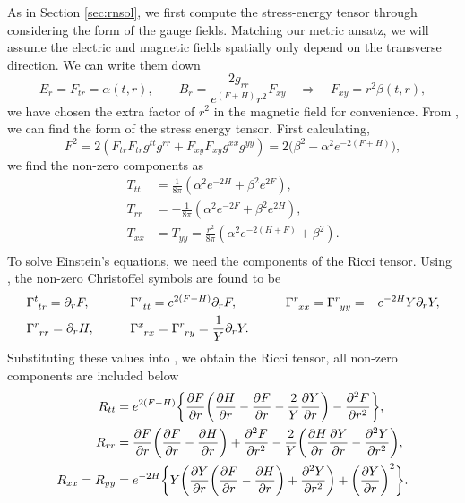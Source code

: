 As in Section \ref{sec:rnsol}, we first compute the stress-energy tensor through considering the form of the gauge fields. Matching our metric ansatz, we will assume the electric and magnetic fields spatially only depend on the transverse direction. We can write them down
\begin{equation*}
   E_r = F_{tr} = \alpha(t,r), \qquad  B_r = \frac{2g_{rr}}{e^{(F+H)}r^2} F_{xy} \quad \Rightarrow \quad F_{xy} = r^2 \beta(t,r),
\end{equation*}
we have chosen the extra factor of $r^2$ in the magnetic field for convenience. From , we can find the form of the stress energy tensor. First calculating,
\begin{equation*}
   F^2 = 2(F_{tr}F_{tr} g^{tt} g^{rr} + F_{xy}F_{xy} g^{xx} g^{yy}) = 2\big(\beta^2 - \alpha^2 e^{-2(F+H)}\big),
\end{equation*}
we find the non-zero components as
\begin{equation*}
   \begin{aligned}
     T_{tt} &= \frac{1}{8\pi} \left( \alpha^2 e^{-2H} + \beta^2 e^{2F} \right), \\
    T_{rr} &=  -\frac{1}{8\pi} \left( \alpha^2 e^{-2F} + \beta^2 e^{2H} \right), \\
    T_{xx} &= T_{yy} = \frac{r^2}{8\pi} \left( \alpha^2 e^{-2(H+F)} + \beta^2\right) .\\
   \end{aligned}
\end{equation*}
To solve Einstein's equations, we need the components of the Ricci tensor. Using , the non-zero Christoffel symbols are found to be
\begin{equation*}
\begin{aligned}
&\tensor{\Gamma}{^{t}_{tr}} = \partial_r F, \qquad  &&\tensor{\Gamma}{^{r}_{tt}} = e^{2(F-H)}\partial_r F ,\qquad  &&&&\tensor{\Gamma}{^{r}_{xx}}  = \tensor{\Gamma}{^{r}_{yy}} = -e^{-2H} Y \partial_r Y, \\
&\tensor{\Gamma}{^{r}_{rr}} = \partial_r H, \qquad   &&\tensor{\Gamma}{^{x}_{rx}}  = \tensor{\Gamma}{^{r}_{ry}} = \frac{1}{Y} \partial_r Y.
\end{aligned}
\end{equation*}
Substituting these values into , we obtain the Ricci tensor, all non-zero components are included below
\begin{equation}
\label{eq:riccicomponentspem}
  \begin{aligned}
    R_{tt} &= e^{2(F-H)} \bigg\{ \frac{\partial F}{\partial r} \bigg( \frac{\partial H}{\partial r} -  \frac{\partial F}{\partial r} - \frac{2}{Y} \frac{\partial Y}{\partial r} \bigg) - \frac{\partial ^2 F}{\partial r^2} \bigg\} ,\\
    R_{rr} &= \frac{\partial F}{\partial r} \bigg( \frac{\partial F}{\partial r} - \frac{\partial H}{\partial r} \bigg) + \frac{\partial ^2F}{\partial r^2} - \frac{2}{Y} \bigg( \frac{\partial H}{\partial r}\frac{\partial Y}{\partial r} - \frac{\partial ^2Y}{\partial r^2} \bigg) ,\\
    R_{xx} = R_{yy} &= e^{-2H} \bigg\{ Y\bigg(\frac{\partial Y}{\partial r}\bigg(\frac{\partial F}{\partial r} - \frac{\partial H}{\partial r} \bigg) + \frac{\partial ^2Y}{\partial r^2} \bigg) + \bigg(\frac{\partial Y}{\partial r}\bigg)^2 \bigg\}.
  \end{aligned}
\end{equation}
